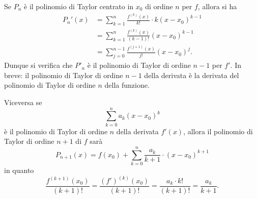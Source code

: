\begin{remark}
  \label{rem:taylor_derivata}%
Se $P_n$ è il polinomio di Taylor centrato in $x_0$ di ordine $n$ per $f$, allora
si ha
\begin{align*}
P_n'(x) &= \sum_{k=1}^{n} \frac{f^{(k)}(x)}{k!}\cdot k(x-x_0)^{k-1} \\
  &= \sum_{k=1}^{n} \frac{f^{(k)}(x)}{(k-1)!} (x-x_0)^{k-1} \\
  &= \sum_{j=0}^{n-1} \frac{f^{(j+1)}(x)}{j!} (x-x_0)^j.
\end{align*}
Dunque si verifica che $P'_n$ è il polinomio di Taylor di ordine $n-1$ per $f'$.
In breve: il polinomio di Taylor di ordine $n-1$ della derivata è la derivata
del polinomio di Taylor di ordine $n$ della funzione.

Viceversa se
\[
   \sum_{k=0}^n a_k (x-x_0)^k
\]
è il polinomio di Taylor di ordine $n$ della derivata $f'(x)$, allora
il polinomio di Taylor di ordine $n+1$ di $f$ sarà%
\begin{equation}\label{eq:4993725}
  P_{n+1}(x) = f(x_0) + \sum_{k=0}^{n} \frac{a_{k}}{k+1}\cdot (x-x_0)^{k+1}
\end{equation}
in quanto
\[
  \frac{f^{(k+1)}(x_0)}{(k+1)!}
  =\frac{(f')^{(k)}(x_0)}{(k+1)!}
  = \frac{a_k \cdot k!}{ (k+1)!}
  = \frac{a_k}{k+1}.
\]
\end{remark}

